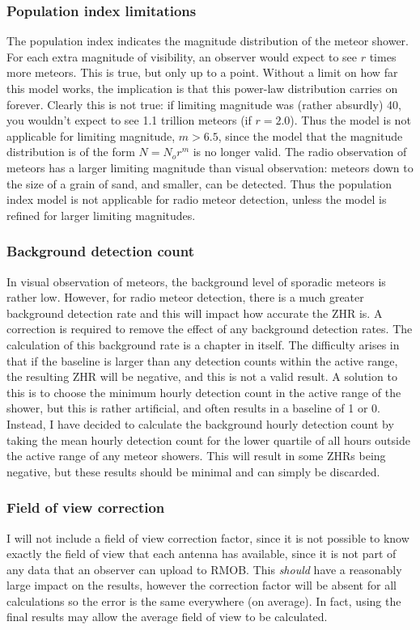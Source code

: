 \subsubsection{Population index limitations}
The population index indicates the magnitude distribution of the meteor shower. For each extra magnitude of visibility, an observer would expect to see $r$ times more meteors. This is true, but only up to a point. Without a limit on how far this model works, the implication is that this power-law distribution carries on forever. Clearly this is not true: if limiting magnitude was (rather absurdly) 40, you wouldn't expect to see 1.1 trillion meteors (if $r=2.0$). Thus the model is not applicable for limiting magnitude, $m > 6.5$, since the model that the magnitude distribution is of the form $N = N_or^m$ is no longer valid. The radio observation of meteors has a larger limiting magnitude than visual observation: meteors down to the size of a grain of sand, and smaller, can be detected. Thus the population index model is not applicable for radio meteor detection, unless the model is refined for larger limiting magnitudes.

\subsubsection{Background detection count}
In visual observation of meteors, the background level of sporadic meteors is rather low. However, for radio meteor detection, there is a much greater background detection rate and this will impact how accurate the ZHR is. A correction is required to remove the effect of any background detection rates. The calculation of this background rate is a chapter in itself. The difficulty arises in that if the baseline is larger than any detection counts within the active range, the resulting ZHR will be negative, and this is not a valid result. A solution to this is to choose the minimum hourly detection count in the active range of the shower, but this is rather artificial, and often results in a baseline of 1 or 0. Instead, I have decided to calculate the background hourly detection count by taking the mean hourly detection count for the lower quartile of all hours outside the active range of any meteor showers. This will result in some ZHRs being negative, but these results should be minimal and can simply be discarded.
\subsubsection{Field of view correction}
I will not include a field of view correction factor, since it is not possible to know exactly the field of view that each antenna has available, since it is not part of any data that an observer can upload to RMOB. This \textit{should} have a reasonably large impact on the results, however the correction factor will be absent for all calculations so the error is the same everywhere (on average). In fact, using the final results may allow the average field of view to be calculated.
